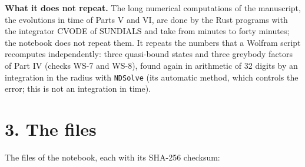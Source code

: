 \documentclass[
  10pt,
]{article}
\begin{document}
\textbf{What it does not repeat.} The long numerical computations of the
manuscript, the evolutions in time of Parts V and VI, are done by the
Rust programs with the integrator CVODE of SUNDIALS and take from
minutes to forty minutes; the notebook does not repeat them. It repeats
the numbers that a Wolfram script recomputes independently: three
quasi-bound states and three greybody factors of Part IV (checks WS-7
and WS-8), found again in arithmetic of 32 digits by an integration in
the radius with \texttt{NDSolve} (its automatic method, which controls
the error; this is not an integration in time).

\hypertarget{the-files}{%
\section{3. The files}\label{the-files}}

The files of the notebook, each with its SHA-256 checksum:
\end{document}
